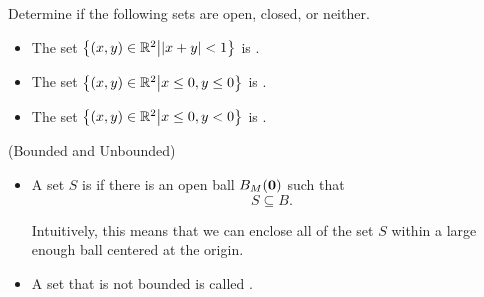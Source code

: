 \documentclass{ximera}
\begin{document}
\begin{question}
Determine if the following sets are open, closed, or neither.

\begin{itemize}
\item The set $\left\{ (x,y) \in \mathbb R^2 \big| |x+y| < 1 \right\}$ is .
\item The set $\left\{ (x,y) \in \mathbb R^2 \big| x \leq 0 , y \leq 0 \right\}$ is .
\item The set $\left\{ (x,y) \in \mathbb R^2 \big| x \leq 0 , y<0\right\}$ is .
\end{itemize}
\end{question}

 
 \begin{definition}   (Bounded and Unbounded) 

      \begin{itemize}
  \item A set $S$ is  if there is an open ball $B_M(\mathbf{0})$ such that
    \[
    S\subseteq B.
    \]
    
    Intuitively, this means that we can enclose all of the set $S$ within a large enough ball centered at the origin.
    
    \item A set that is not bounded is called .
  \end{itemize}

\end{definition}
\end{document}
